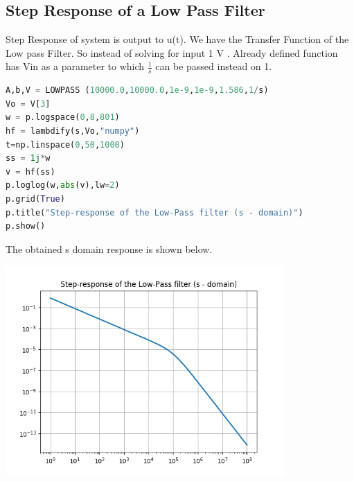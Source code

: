 \documentclass[a4paper]{article}
\begin{document}
\subsection{Step Response of a Low Pass Filter}
Step Response of system is output to u(t). We have the Transfer Function of the Low pass Filter. So instead of solving for input 1 V . Already defined function has Vin as a parameter to which $\frac{1}{s}$ can be passed instead on 1.   

\begin{lstlisting}[language=Python]
A,b,V = LOWPASS	(10000.0,10000.0,1e-9,1e-9,1.586,1/s)
Vo = V[3]
w = p.logspace(0,8,801)
hf = lambdify(s,Vo,"numpy")
t=np.linspace(0,50,1000)	
ss = 1j*w
v = hf(ss)
p.loglog(w,abs(v),lw=2)
p.grid(True)
p.title("Step-response of the Low-Pass filter (s - domain)")
p.show()
\end{lstlisting}
The obtained s domain response is shown below.
\begin{center}
\includegraphics[width=0.8\textwidth]{Figure_6.png}
\end{center}
\end{document}
